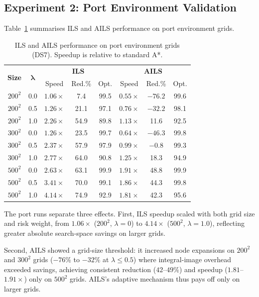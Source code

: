 \documentclass[preprint,12pt,authoryear]{elsarticle}
\begin{document}
\subsection{Experiment 2: Port Environment Validation}

Table~\ref{tab:exp2_port} summarises ILS and AILS performance on port environment grids.

\begin{table}[!htbp]
\centering
\caption{ILS and AILS performance on port environment grids (DS7). Speedup is relative to standard A*.}
\label{tab:exp2_port}
\begin{tabular}{cccccccc}
\toprule
\multirow{2}{*}{\textbf{Size}} & \multirow{2}{*}{$\boldsymbol{\lambda}$} & \multicolumn{3}{c}{\textbf{ILS}} & \multicolumn{3}{c}{\textbf{AILS}} \\
& & Speed & Red.\% & Opt. & Speed & Red.\% & Opt. \\
\midrule
$200^2$ & 0.0 & $1.06\times$ & 7.4 & 99.5 & $0.55\times$ & $-76.2$ & 99.6 \\
$200^2$ & 0.5 & $1.26\times$ & 21.1 & 97.1 & $0.76\times$ & $-32.2$ & 98.1 \\
$200^2$ & 1.0 & $2.26\times$ & 54.9 & 89.8 & $1.13\times$ & 11.6 & 92.5 \\
\midrule
$300^2$ & 0.0 & $1.26\times$ & 23.5 & 99.7 & $0.64\times$ & $-46.3$ & 99.8 \\
$300^2$ & 0.5 & $2.37\times$ & 57.9 & 97.9 & $0.99\times$ & $-0.8$ & 99.3 \\
$300^2$ & 1.0 & $2.77\times$ & 64.0 & 90.8 & $1.25\times$ & 18.3 & 94.9 \\
\midrule
$500^2$ & 0.0 & $2.63\times$ & 63.1 & 99.9 & $1.91\times$ & 48.8 & 99.9 \\
$500^2$ & 0.5 & $3.41\times$ & 70.0 & 99.1 & $1.86\times$ & 44.3 & 99.8 \\
$500^2$ & 1.0 & $4.14\times$ & 74.9 & 92.9 & $1.81\times$ & 42.3 & 95.6 \\
\bottomrule
\end{tabular}
\end{table}

The port runs separate three effects. First, ILS speedup scaled with both grid size and risk weight, from $1.06\times$ ($200^2$, $\lambda = 0$) to $4.14\times$ ($500^2$, $\lambda = 1.0$), reflecting greater absolute search-space savings on larger grids.

Second, AILS showed a grid-size threshold: it increased node expansions on $200^2$ and $300^2$ grids ($-76\%$ to $-32\%$ at $\lambda \leq 0.5$) where integral-image overhead exceeded savings, achieving consistent reduction ($42$--$49\%$) and speedup ($1.81$--$1.91\times$) only on $500^2$ grids. AILS's adaptive mechanism thus pays off only on larger grids.
\end{document}
